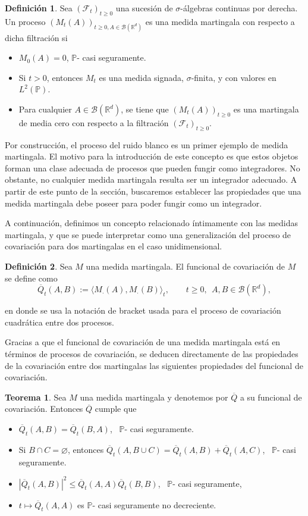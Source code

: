 \documentclass[letterpaper,twoside,12pt]{book}
\newcommand{\R}{\mathbb{R}}
\newcommand{\F}{\mathcal{F}}
\newcommand{\B}{\mathcal{B}}
\renewcommand{\P}{\mathbb{P}}
\newcommand{\1}{\mathds{1}}
\newcommand{\abs}[1]{\left\lvert #1 \right\rvert}
\theoremstyle{definition}
\newtheorem{dfn}{Definición}
\theoremstyle{definition}
\newtheorem{teo}{Teorema}
\theoremstyle{remark}
\theoremstyle{definition}
\theoremstyle{definition}
\theoremstyle{definition}
\theoremstyle{definition}
\theoremstyle{definition}
\begin{document}
\begin{dfn} 
Sea $(\F_t)_{t\geq0}$ una sucesión de $\sigma$-álgebras continuas por derecha. Un proceso $(M_t(A))_{t\geq0, A\in \B(\R^{d})}$ es una medida martingala con respecto a dicha filtración si 
\begin{itemize}
   \item $M_0(A)=0$, $\P$- casi seguramente.
   \item Si $t>0$, entonces $M_t$ es una medida signada, $\sigma$-finita, y con valores en $L^2(\P)$.
   \item Para cualquier $A\in \B(\R^{d})$, se tiene que $(M_t(A))_{t\geq0}$ es una martingala de media cero con respecto a la filtración $(\F_t)_{t\geq0}$.
\end{itemize}
\end{dfn}
Por construcción, el proceso del ruido blanco es un primer ejemplo de medida martingala. El motivo para la introducción de este concepto es que estos objetos forman una clase adecuada de procesos que pueden fungir como integradores. No obstante, no cualquier medida martingala resulta ser un integrador adecuado. A partir de este punto de la sección, buscaremos establecer las propiedades que una medida martingala debe poseer para poder fungir como un integrador. 

A continuación, definimos un concepto relacionado íntimamente con las medidas martingala, y que se puede interpretar como una generalización del proceso de covariación para dos martingalas en el caso unidimensional.
\begin{dfn} 
 Sea $M$ una medida martingala. El funcional de covariación de $M$ se define como
 \[
 \overline{Q}_t(A,B):= \langle M_\cdot(A),M_\cdot (B)\rangle_t, \qquad t\geq 0, \ \ A, B \in \B(\R^{d}), 
 \]
 \end{dfn}
 en donde se usa la notación de bracket usada para el proceso de covariación cuadrática entre dos procesos.

 Gracias a que el funcional de covariación de una medida martingala está en términos de procesos de covariación, se deducen directamente de las propiedades de la covariación entre dos martingalas las siguientes propiedades del funcional de covariación.
 \begin{teo} 
  Sea $M$ una medida martingala y denotemos por $\overline{Q}$ a su funcional de covariación. Entonces $\overline{Q}$ cumple que
  \begin{itemize}
   \item $\overline{Q}_t(A,B)=\overline{Q}_t(B,A)$, \ $\P$- casi seguramente.
   \item Si $B\cap C=\varnothing$, entonces $\overline{Q}_t(A,B\cup C)=\overline{Q}_t(A,B)+\overline{Q}_t(A,C)$, \ $\P$- casi seguramente.
   \item $\abs{\overline{Q}_t(A,B)}^2\leq \overline{Q}_t(A,A)\overline{Q}_t(B,B)$, \ $\P$- casi seguramente, 
   \item $t\mapsto\overline{Q}_t(A,A)$ es $\P$- casi seguramente no decreciente.
  \end{itemize}
  \end{teo}
\end{document}
